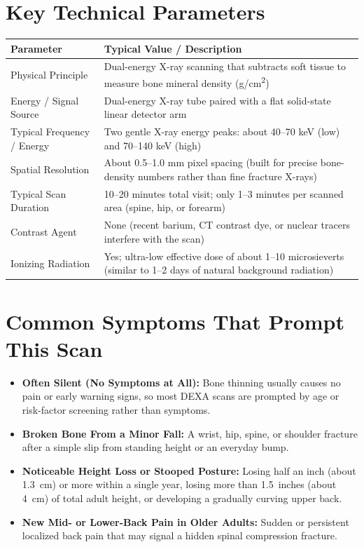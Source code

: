 \section{Key Technical Parameters}
\noindent
\begin{tabularx}{\textwidth}{@{}l X@{}}
\toprule
\textbf{Parameter} & \textbf{Typical Value / Description} \\
\midrule
Physical Principle & Dual-energy X-ray scanning that subtracts soft tissue to measure bone mineral density (g/cm\textsuperscript{2}) \\
Energy / Signal Source & Dual-energy X-ray tube paired with a flat solid-state linear detector arm \\
Typical Frequency / Energy & Two gentle X-ray energy peaks: about 40--70 keV (low) and 70--140 keV (high) \\
Spatial Resolution & About 0.5--1.0 mm pixel spacing (built for precise bone-density numbers rather than fine fracture X-rays) \\
Typical Scan Duration & 10--20 minutes total visit; only 1--3 minutes per scanned area (spine, hip, or forearm) \\
Contrast Agent & None (recent barium, CT contrast dye, or nuclear tracers interfere with the scan) \\
Ionizing Radiation & Yes; ultra-low effective dose of about 1--10 microsieverts (similar to 1--2 days of natural background radiation) \\
\bottomrule
\end{tabularx}

\section{Common Symptoms That Prompt This Scan}
\begin{itemize}
\item \textbf{Often Silent (No Symptoms at All):} Bone thinning usually causes no pain or early warning signs, so most DEXA scans are prompted by age or risk-factor screening rather than symptoms.
\item \textbf{Broken Bone From a Minor Fall:} A wrist, hip, spine, or shoulder fracture after a simple slip from standing height or an everyday bump.
\item \textbf{Noticeable Height Loss or Stooped Posture:} Losing half an inch (about 1.3~cm) or more within a single year, losing more than 1.5~inches (about 4~cm) of total adult height, or developing a gradually curving upper back.
\item \textbf{New Mid- or Lower-Back Pain in Older Adults:} Sudden or persistent localized back pain that may signal a hidden spinal compression fracture.
\end{itemize}

